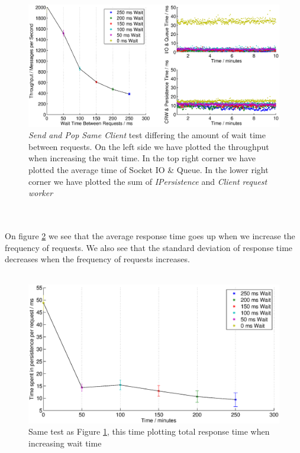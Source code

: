 \documentclass{article}
\begin{document}
             \begin{figure}[H]
                    \centering
                    \centerline{\includegraphics[scale=0.65]{sleep_time_between_requests_100clients_30_30}}
                    \caption{\textit{Send and Pop Same Client} test differing the amount of wait time between requests. On the left side we have plotted the throughput when increasing the wait time. In the top right corner we have plotted the average time of Socket IO \& Queue. In the lower right corner we have plotted the sum of \textit{IPersistence} and \textit{Client request worker}}
                    \label{fig:sleep_time_between_requests_100clients_30_30}
             \end{figure}
             ~\\
             \\
             On figure \ref{fig:sleep_time_between_requests_respTime_100clients_30_30} we see that the average response time goes up when we increase the frequency of requests. We also see that the standard deviation of response time decreases when the frequency of requests increases.\\
             \\
              \begin{figure}[H]
                      \centering
                      \centerline{\includegraphics[scale=0.60]{sleep_time_between_requests_respTime_100clients_30_30}}
                      \caption{Same test as Figure \ref{fig:sleep_time_between_requests_100clients_30_30}, this time plotting total response time when increasing wait time}
                      \label{fig:sleep_time_between_requests_respTime_100clients_30_30}
              \end{figure}
\end{document}
